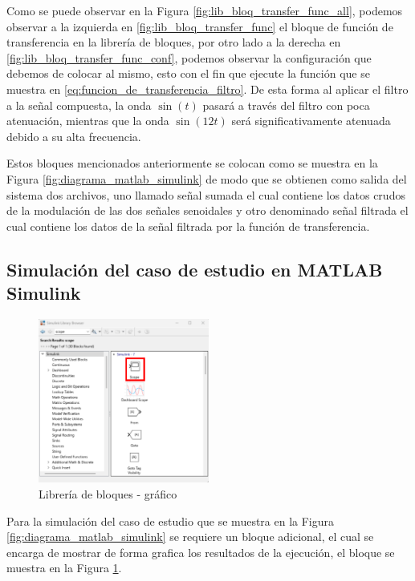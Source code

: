 Como se puede observar en la Figura \ref{fig:lib_bloq_transfer_func_all}, podemos observar a la izquierda en \ref{fig:lib_bloq_transfer_func} el bloque de función de transferencia en la librería de bloques, por otro lado a la derecha en \ref{fig:lib_bloq_transfer_func_conf}, podemos observar la configuración que debemos de colocar al mismo, esto con el fin que ejecute la función que se muestra en \ref{eq:funcion_de_transferencia_filtro}. De esta forma al aplicar el filtro a la señal compuesta,  la onda $\sin(t)$ pasará a través del filtro con poca atenuación, mientras que la onda $\sin(12t)$ será significativamente atenuada debido a su  alta frecuencia.

Estos bloques mencionados anteriormente se colocan como se muestra en la Figura \ref{fig:diagrama_matlab_simulink} de modo que se obtienen como salida del sistema dos archivos, uno llamado señal sumada el cual contiene los datos crudos de la modulación de las dos señales senoidales y otro denominado señal filtrada el cual contiene los datos de la señal filtrada por la función de transferencia.

\newpage

\subsection{Simulación del caso de estudio en MATLAB Simulink}\label{subsec:simulacion_caso_de_estudio}

\begin{figure}[h!]
    \centering
    \includegraphics[width=0.5\textwidth]{fig/especifico_2/CASO_ESTUDIO_FILTRO/scope_0.pdf}
    \caption{Librería de bloques - gráfico}
    \label{fig:lib_bloq_graph}
\end{figure}

Para la simulación del caso de estudio que se muestra en la Figura \ref{fig:diagrama_matlab_simulink} se requiere un bloque adicional, el cual se encarga de mostrar de forma grafica los resultados de la ejecución, el bloque se muestra en la Figura \ref{fig:lib_bloq_graph}.

